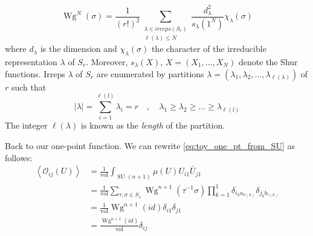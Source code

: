 \documentclass[a4paper,11pt]{article}
\theoremstyle{definition}
\DeclareMathOperator{\SU}{SU}
\DeclareMathOperator{\vol}{vol}
\DeclareMathOperator{\Wg}{Wg}
\newcommand{\OO}{\mathcal O}
\begin{document}
\begin{equation}
  \Wg^{N}(\sigma) = \frac{1}{(r!)^2} \sum_{\substack{\lambda \in irreps(S_r) \\ \ell(\lambda) \leq N}} \frac{d^2_{\lambda}}{s_{\lambda}(1^N)}\chi_{\lambda}(\sigma)
\end{equation}
where $d_{\lambda}$ is the dimension and $\chi_{\lambda}(\sigma)$ the character of the irreducible representation $\lambda$ of $S_r$.
Moreover, $s_{\lambda}(X)$, $X = (X_1,\dots,X_N)$ denote the Shur functions.
Irreps $\lambda$ of $S_r$ are enumerated by partitions $\lambda = (\lambda_1,\lambda_2,\dots,\lambda_{\ell(\lambda)})$ of $r$ such that 
\begin{equation}
  \lvert\lambda\rvert = \sum_{i=1}^{\ell(l)} \lambda_i = r \quad , \quad \lambda_1 \geq \lambda_2 \geq \dots \geq \lambda_{\ell(l)}
\end{equation}
The integer $\ell(\lambda)$ is known as the \emph{length} of the partition.

Back to our one-point function.
We can rewrite \eqref{eq:toy_one_pt_from_SU} as follows:
\begin{equation}
  \begin{split} 
    \left\langle \OO_{ij}(U) \right\rangle &= \frac{1}{\vol} \int_{\SU(n+1)}\mu(U) U_{i1}\bar U_{j1} \\
    &= \frac{1}{\vol} \sum_{\tau,\sigma \in S_1} \Wg^{n+1}(\tau^{-1}\sigma) \prod_{k = 1}^1 \delta_{i_k a_{\sigma(k)}}\delta_{j_k b_{\tau(k)}} \\
    &= \frac{1}{\vol} \Wg^{n+1}(id) \delta_{i1}\delta_{j1}\\
    &= \frac{\Wg^{n+1}(id)}{\vol} \delta_{ij}
  \end{split}
\end{equation}
\end{document}
